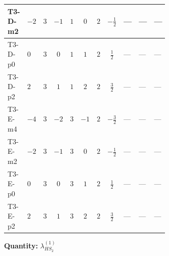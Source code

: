 \documentclass[8pt]{article}
\begin{document}
\begin{landscape}
\begin{longtable}{@{}llcccccc >{\raggedright\arraybackslash}p{0.21\linewidth} >{\raggedright\arraybackslash}p{0.21\linewidth} >{\raggedright\arraybackslash}p{0.21\linewidth}@{}}
\midrule
T3-D-m2 & $-2$ & $3$ & $-1$ & $1$ & $0$ & $2$ & $-\frac{1}{2}$ & --- & --- & --- \\
\midrule
T3-D-p0 & $0$ & $3$ & $0$ & $1$ & $1$ & $2$ & $\frac{1}{2}$ & --- & --- & --- \\
\midrule
T3-D-p2 & $2$ & $3$ & $1$ & $1$ & $2$ & $2$ & $\frac{3}{2}$ & --- & --- & --- \\
\midrule
T3-E-m4 & $-4$ & $3$ & $-2$ & $3$ & $-1$ & $2$ & $-\frac{3}{2}$ & --- & --- & --- \\
\midrule
T3-E-m2 & $-2$ & $3$ & $-1$ & $3$ & $0$ & $2$ & $-\frac{1}{2}$ & --- & --- & --- \\
\midrule
T3-E-p0 & $0$ & $3$ & $0$ & $3$ & $1$ & $2$ & $\frac{1}{2}$ & --- & --- & --- \\
\midrule
T3-E-p2 & $2$ & $3$ & $1$ & $3$ & $2$ & $2$ & $\frac{3}{2}$ & --- & --- & --- \\
\midrule
\bottomrule
\end{longtable}
\clearpage
\noindent\textbf{Quantity: }$\lambda_{HS_2}^{(1)}$\par\smallskip

\end{landscape}
\end{document}
